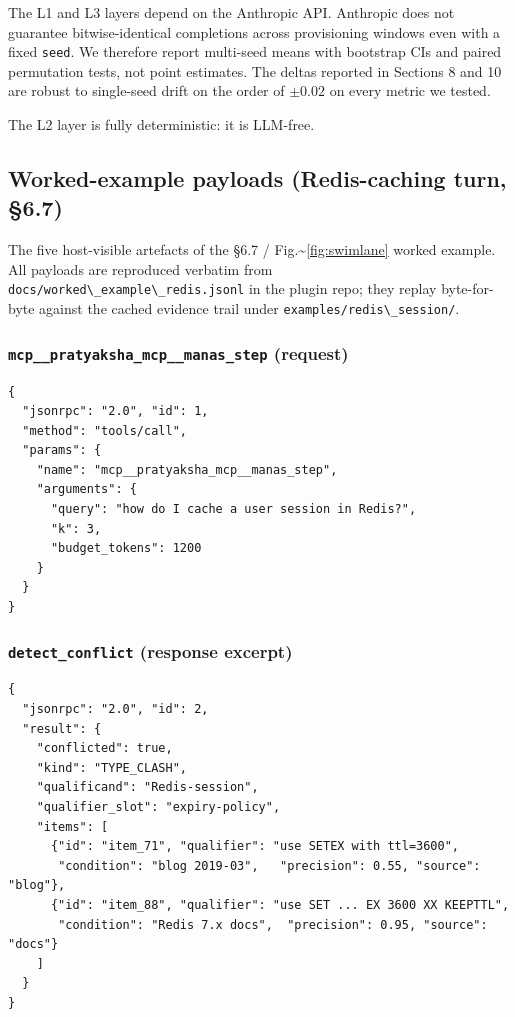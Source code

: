 The L1 and L3 layers depend on the Anthropic API. Anthropic does not guarantee bitwise-identical completions across provisioning windows even with a fixed \passthrough{\lstinline!seed!}. We therefore report multi-seed means with bootstrap CIs and paired permutation tests, not point estimates. The deltas reported in Sections 8 and 10 are robust to single-seed drift on the order of \(\pm 0.02\) on every metric we tested.

The L2 layer is fully deterministic: it is LLM-free.

\subsection{Worked-example payloads (Redis-caching turn, §6.7)}\label{worked-example-payloads-redis-caching-turn-6.7}

The five host-visible artefacts of the §6.7 / Fig.\textasciitilde{}\ref{fig:swimlane} worked example. All payloads are reproduced verbatim from \passthrough{\lstinline!docs/worked\_example\_redis.jsonl!} in the plugin repo; they replay byte-for-byte against the cached evidence trail under \passthrough{\lstinline!examples/redis\_session/!}.

\subsubsection{\texorpdfstring{\texttt{mcp\_\_pratyaksha\_mcp\_\_manas\_step} (request)}{mcp\_\_pratyaksha\_mcp\_\_manas\_step (request)}}\label{mcp__pratyaksha_mcp__manas_step-request}

\begin{lstlisting}
{
  "jsonrpc": "2.0", "id": 1,
  "method": "tools/call",
  "params": {
    "name": "mcp__pratyaksha_mcp__manas_step",
    "arguments": {
      "query": "how do I cache a user session in Redis?",
      "k": 3,
      "budget_tokens": 1200
    }
  }
}
\end{lstlisting}

\subsubsection{\texorpdfstring{\texttt{detect\_conflict} (response excerpt)}{detect\_conflict (response excerpt)}}\label{detect_conflict-response-excerpt}

\begin{lstlisting}
{
  "jsonrpc": "2.0", "id": 2,
  "result": {
    "conflicted": true,
    "kind": "TYPE_CLASH",
    "qualificand": "Redis-session",
    "qualifier_slot": "expiry-policy",
    "items": [
      {"id": "item_71", "qualifier": "use SETEX with ttl=3600",
       "condition": "blog 2019-03",   "precision": 0.55, "source": "blog"},
      {"id": "item_88", "qualifier": "use SET ... EX 3600 XX KEEPTTL",
       "condition": "Redis 7.x docs",  "precision": 0.95, "source": "docs"}
    ]
  }
}
\end{lstlisting}

